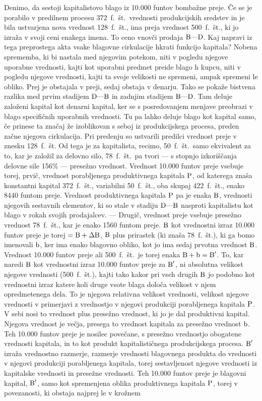 \documentclass[kapital_02.tex]{subfiles}
\begin{document}
Denimo, da sestoji kapitalistovo blago iz 10.000 funtov bombažne preje. Če se je porabilo v predilnem procesu 372~f.~št.\ vrednosti produkcijskih sredstev in je bila ustvarjena nova vrednost 128~f.~št., ima preja vrednost 500~f.~št., ki jo izraža v svoji ceni enakega imena. To ceno vnovči prodaja \( \textrm{B}\textrm{---}\textrm{D} \). Kaj napravi iz tega preprostega akta vsake blagovne cirkulacije hkrati funkcijo kapitala? Nobena sprememba, ki bi nastala med njegovim potekom, niti v pogledu njegove uporabne vrednosti, kajti kot uporabni predmet preide blago h kupcu, niti v pogledu njegove vrednosti, kajti ta svoje velikosti ne spremeni, ampak spremeni le obliko. Prej je obstajala v preji, sedaj obstaja v denarju. Tako se pokaže bistvena razlika med prvim stadijem \( \textrm{D}\textrm{---}\textrm{B} \) in zadnjim stadijem \( \textrm{B}\textrm{---}\textrm{D} \). Tam deluje založeni kapital kot denarni kapital, ker se s posredovanjem menjave preobrazi v blago specifičnih uporabnih vrednosti. Tu pa lahko deluje blago kot kapital samo, če prinese ta značaj že izoblikovan s seboj iz produkcijskega procesa, preden začne njegova cirkulacija. Pri predenju so ustvarili predilci vrednost preje v znesku 128~f.~št. Od tega je za kapitalista, recimo, 50~f.~št.\ samo ekvivalent za to, kar je založil za delovno silo, 78~f.~št.\ pa tvori --- s stopnjo izkoriščanja delovne sile 156\% --- presežno vrednost. Vrednost 10.000 funtov preje vsebuje torej, prvič, vrednost porabljenega produktivnega kapitala \( \textrm{P} \), od katerega znaša konstantni kapital 372~f.~št., variabilni 50~f.~št., oba skupaj 422~f.~št., enako 8440 funtom preje. Vrednost produktivnega kapitala \( \textrm{P} \) pa je enaka \( \textrm{B} \), vrednosti njegovih sestavnih elementov, ki so stale v stadiju \( \textrm{D}\textrm{---}\textrm{B} \) nasproti kapitalistu kot blago v rokah svojih prodajalcev. --- Drugič, vrednost preje vsebuje presežno vrednost 78~f.~št., kar je enako 1560 funtom preje. \( \textrm{B} \) kot vrednostni izraz 10.000 funtov preje je torej \( = \textrm{B} + \Delta\textrm{B} \), \( \textrm{B} \) plus prirastek (ki znaša 78~f.~št.), ki ga bomo imenovali \( \textrm{b} \), ker ima enako blagovno obliko, kot jo ima sedaj prvotna vrednost \( \textrm{B} \). Vrednost 10.000 funtov preje ali 500~f.~št.\ je torej enaka \( \textrm{B} + \textrm{b} = \textrm{B}' \). To, kar naredi \( \textrm{B} \) kot vrednostni izraz 10.000 funtov preje za \( \textrm{B}' \), ni absolutna velikost njegove vrednosti (500~f.~št.), kajti tako kakor pri vseh drugih \( \textrm{B} \) jo podobno kot vrednostni izraz katere koli druge vsote blaga določa velikost v njem opredmetenega dela. To je njegova relativna velikost vrednosti, velikost njegove vrednosti v primerjavi z vrednostjo v njegovi produkciji porabljenega kapitala \( \textrm{P} \). V sebi nosi to vrednost plus presežno vrednost, ki jo je dal produktivni kapital. Njegova vrednost je večja, presega to vrednost kapitala za presežno vrednost \( \textrm{b} \). Teh 10.000 funtov preje je nosilec povečane, s presežno vrednostjo obogatene vrednosti kapitala, in to kot produkt kapitalističnega produkcijskega procesa. \( \textrm{B}' \) izraža vrednostno razmerje, razmerje vrednosti blagovnega produkta do vrednosti v njegovi produkciji porabljenega kapitala, torej sestavljenost njegove vrednosti iz kapitalske vrednosti in presežne vrednosti. Teh 10.000 funtov preje je blagovni kapital, \( \textrm{B}' \), samo kot spremenjena oblika produktivnega kapitala \( \textrm{P} \), torej v povezanosti, ki obstaja najprej le v krožnem 
\end{document}
